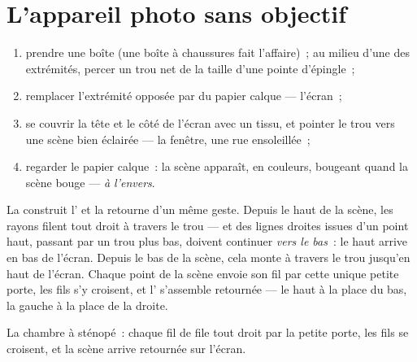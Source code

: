 \section{L'appareil photo sans objectif}

\begin{method}\label{met:g6:light-propagation:pinhole}
\begin{enumerate}
  \item prendre une boîte (une boîte à chaussures fait l'affaire)~;
        au milieu d'une des extrémités, percer un trou net de la
        taille d'une pointe d'épingle~;
  \item remplacer l'extrémité opposée par du papier calque ---
        l'écran~;
  \item se couvrir la tête et le côté de l'écran avec un tissu, et
        pointer le trou vers une scène bien éclairée --- la
        fenêtre, une rue ensoleillée~;
  \item regarder le papier calque~: la scène apparaît, en couleurs,
        bougeant quand la scène bouge --- \emph{à l'envers}.
\end{enumerate}
\end{method}

\begin{proposition}\label{prop:g6:light-propagation:inverted}
La  construit l' et la retourne d'un même
geste. Depuis le haut de la scène, les rayons filent tout droit à
travers le trou --- et des lignes droites issues d'un point haut,
passant par un trou plus bas, doivent continuer \emph{vers le bas}~:
le haut arrive en bas de l'écran. Depuis le bas de la scène, cela
monte à travers le trou jusqu'en haut de l'écran. Chaque point de la
scène envoie son fil par cette unique petite porte, les fils s'y
croisent, et l' s'assemble retournée --- le haut à la place du
bas, la gauche à la place de la droite.
\end{proposition}

\begin{omfigure}

{\small La chambre à sténopé~: chaque fil de  file tout droit
par la petite porte, les fils se croisent, et la scène arrive
retournée sur l'écran.}
\end{omfigure}

